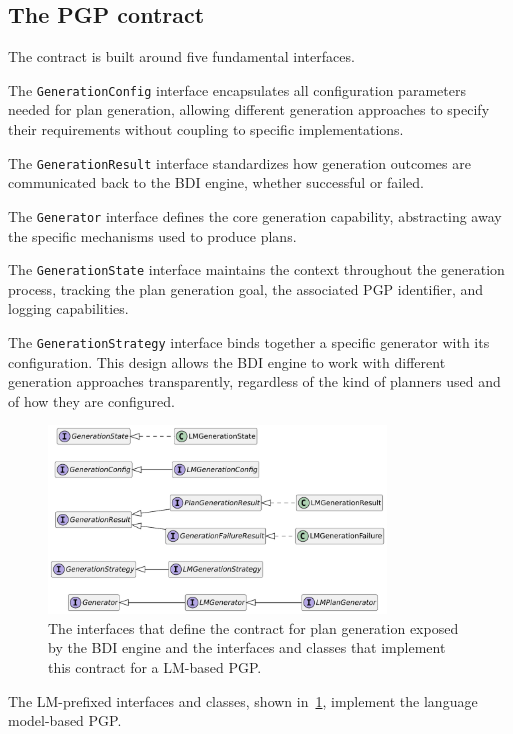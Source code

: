 \documentclass[12pt,a4paper,openright,twoside]{book}
\begin{document}
\subsection{The PGP contract}\label{sec:pgp-contract}

The contract is built around five fundamental interfaces. 

The \texttt{GenerationConfig} interface encapsulates all configuration parameters needed for plan generation, allowing different generation approaches to specify their requirements without coupling to specific implementations.

The \texttt{GenerationResult} interface standardizes how generation outcomes are communicated back to the \ac{BDI} engine, whether successful or failed.

The \texttt{Generator} interface defines the core generation capability, abstracting away the specific mechanisms used to produce plans.

The \texttt{GenerationState} interface maintains the context throughout the generation process, tracking the plan generation goal, the associated \ac{PGP} identifier, and logging capabilities. 

The \texttt{GenerationStrategy} interface binds together a specific generator with its configuration. This design allows the \ac{BDI} engine to work with different generation approaches transparently, regardless of the kind of planners used and of how they are configured.

\begin{figure}
    \centering
    \includegraphics[width=0.8\textwidth]{figures/gen-interfaces.pdf}
    \caption{The interfaces that define the contract for plan generation exposed by the \ac{BDI} engine and the interfaces and classes that implement this contract for a LM-based PGP.}
    \label{fig:gen-interfaces}
\end{figure}

The LM-prefixed interfaces and classes, shown in~\cref{fig:gen-interfaces}, implement the language model-based \ac{PGP}.
\end{document}
